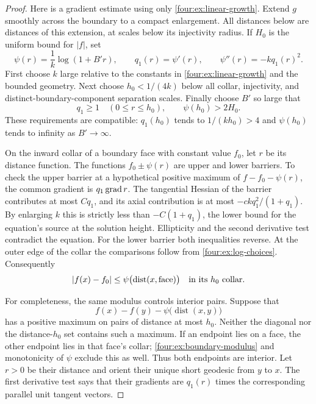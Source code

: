 \begin{proof}
Here is a gradient estimate using only \eqref{four:ex:linear-growth}.
Extend $g$ smoothly across the boundary to a compact enlargement.  All
distances below are distances of this extension, at scales below its
injectivity radius.  If $H_0$ is the uniform bound for $|f|$, set
\[
 \psi(r)=\frac1k\log(1+B'r),\qquad
 q_1(r)=\psi'(r),\qquad \psi''(r)=-kq_1(r)^2.
\]
First choose $k$ large relative to the constants in
\eqref{four:ex:linear-growth} and the bounded geometry.  Next choose
$h_0<1/(4k)$ below all collar, injectivity, and distinct-boundary-component
separation scales.  Finally choose $B'$ so large that
\begin{equation}\label{four:ex:log-choices}
 q_1\ge1\quad(0\le r\le h_0),\qquad
 \psi(h_0)>2H_0.
\end{equation}
These requirements are compatible: $q_1(h_0)$ tends to $1/(kh_0)>4$
and $\psi(h_0)$ tends to infinity as $B'\to\infty$.

On the inward collar of a boundary face with constant value $f_0$,
let $r$ be its distance function.  The functions
$f_0\pm\psi(r)$ are upper and lower barriers.  To check the upper
barrier at a hypothetical positive maximum of
$f-f_0-\psi(r)$, the common gradient is $q_1\operatorname{grad} r$.  The tangential
Hessian of the barrier contributes at most $Cq_1$, and its axial
contribution is at most $-ckq_1^2/(1+q_1)$.  By enlarging $k$ this is
strictly less than $-C(1+q_1)$, the lower bound for the equation's
source at the solution height.  Ellipticity and the second derivative
test contradict the equation.  For the lower barrier both inequalities
reverse.  At the outer edge of the collar the comparisons follow from
\eqref{four:ex:log-choices}.  Consequently
\begin{equation}\label{four:ex:boundary-modulus}
 |f(x)-f_0|\le\psi\bigl(\operatorname{dist}(x,\mathrm{face})\bigr)
 \quad\hbox{in its $h_0$ collar}.
\end{equation}

For completeness, the same modulus controls interior pairs.  Suppose
that
\[
 f(x)-f(y)-\psi\bigl(\operatorname{dist}(x,y)\bigr)
\]
has a positive maximum on pairs of distance at most $h_0$.  Neither
the diagonal nor the distance-$h_0$ set contains such a maximum.
If an endpoint lies on a face, the other endpoint lies in that face's
collar; \eqref{four:ex:boundary-modulus} and monotonicity of $\psi$ exclude
this as well.  Thus both endpoints are interior.  Let $r>0$ be their
distance and orient their unique short geodesic from $y$ to $x$.
The first derivative test says that their gradients are $q_1(r)$ times
the corresponding parallel unit tangent vectors.


\end{proof}
